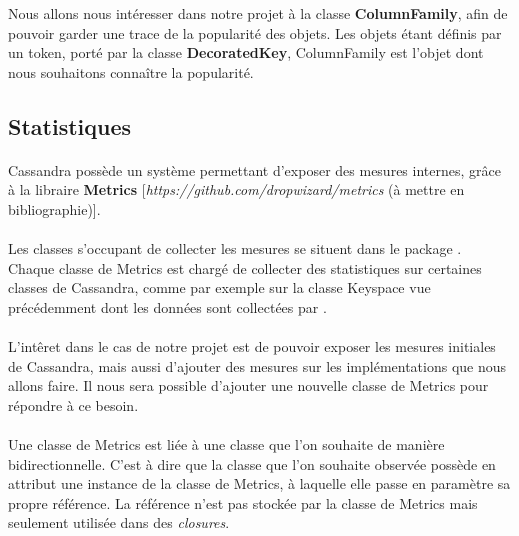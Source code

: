 \documentclass[12pt]{article}
\begin{document}
Nous allons nous intéresser dans notre projet à la classe \textbf{ColumnFamily}, afin de pouvoir garder une trace de la popularité des objets. Les objets étant définis par un token, porté par la classe \textbf{DecoratedKey}, ColumnFamily est l'objet dont nous souhaitons connaître la popularité.

\subsection{Statistiques}

\paragraph{} Cassandra possède un système permettant d'exposer des mesures internes, grâce à la libraire \textbf{Metrics} [\textit{https://github.com/dropwizard/metrics} (à mettre en bibliographie)].

\paragraph{} Les classes s'occupant de collecter les mesures se situent dans le package . Chaque classe de Metrics est chargé de collecter des statistiques sur certaines classes de Cassandra, comme par exemple sur la classe Keyspace vue précédemment dont les données sont collectées par .

\paragraph{} L'intêret dans le cas de notre projet est de pouvoir exposer les mesures initiales de Cassandra, mais aussi d'ajouter des mesures sur les implémentations que nous allons faire. Il nous sera possible d'ajouter une nouvelle classe de Metrics pour répondre à ce besoin.

\paragraph{} Une classe de Metrics est liée à une classe que l'on souhaite de manière bidirectionnelle. C'est à dire que la classe que l'on souhaite observée possède en attribut une instance de la classe de Metrics, à laquelle elle passe en paramètre sa propre référence. La référence n'est pas stockée par la classe de Metrics mais seulement utilisée dans des \textit{closures}.
\end{document}
